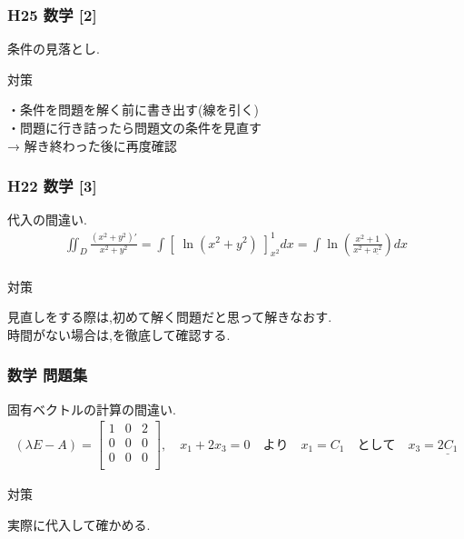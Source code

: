 \documentclass[a4paper]{jsarticle}
\begin{document}
\subsubsection{H25 数学 [2]}
条件の見落とし.
\begin{itembox}[l]{対策}
    \begin{center}
        ・条件を問題を解く前に書き出す(線を引く)\\
        ・問題に行き詰ったら問題文の条件を見直す\\
        → 解き終わった後に再度確認
    \end{center}
\end{itembox}
\subsubsection{H22 数学 [3]}
代入の間違い.
\begin{eqnarray*}
    \iint _D \frac{\left(x^2 + y^2 \right)'}{x^2+y^2}
    = \int \left[\;\ln \left(x^2+y^2\right)\;\right]^1_{x^2} dx
    = \int \ln \left(\frac{x^2 + 1}{x^2 + \underline{x^2}}\right) dx\\
\end{eqnarray*}
\begin{itembox}[l]{対策}
    \begin{center}
        見直しをする際は,初めて解く問題だと思って解きなおす.\\
        時間がない場合は,を徹底して確認する.
    \end{center}
\end{itembox}
\subsubsection{数学 問題集}
固有ベクトルの計算の間違い.
\begin{eqnarray*}
    \left(\lambda E - A\right)=
    \begin{bmatrix}
        1 & 0 & 2 \\
        0 & 0 & 0 \\
        0 & 0 & 0 \\
    \end{bmatrix} ,\quad
    x_1 + 2x_3 =0 \quad より \quad
    x_1=C_1\quad として \quad x_3 = \underline{2C_1}
\end{eqnarray*}
\begin{itembox}[l]{対策}
    \begin{center}
        実際に代入して確かめる.
    \end{center}
\end{itembox}
\end{document}
